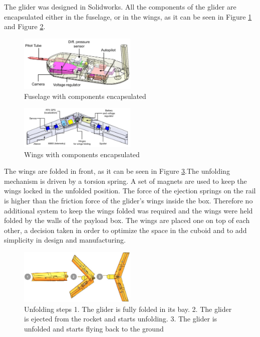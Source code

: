 The glider was designed in Solidworks. All the components of the glider are encapsulated either in the fuselage, or in the wings, as it can be seen in Figure \ref{f:fuseg} and Figure  \ref{f:wings}.

\begin{figure}[h!]
    \centering
        \includegraphics[width=0.5\textwidth]{img/fuselage.jpg}
        \caption{Fuselage with components encapsulated}
        \label{f:fuseg}
 \end{figure}

\begin{figure}[h!]
    \centering
        \includegraphics[width=0.5\textwidth]{img/wings.jpg}
        \caption{Wings with components encapsulated}
        \label{f:wings}
 \end{figure}



The wings are folded in front, as it can be seen in Figure \ref{f:folding}.The unfolding mechanism is driven by a torsion spring. A set of magnets are used to keep the wings locked in the unfolded position. The force of the ejection springs on the rail is higher than the friction force of the glider's wings inside the box. Therefore no additional system to keep the wings folded was required and the wings were held folded by the walls of the payload box. The wings are placed one on top of each other, a decision taken in order to optimize the space in the cuboid and to add simplicity in design and manufacturing.

\begin{figure}[h!]
    \centering
        \includegraphics[width=0.5\textwidth]{img/folding.jpg}
        \caption{Unfolding steps 1. The glider is fully folded in its bay. 2. The glider is ejected from the rocket and starts unfolding. 3. The glider is unfolded and starts flying back to the ground}
        \label{f:folding}
 \end{figure}

